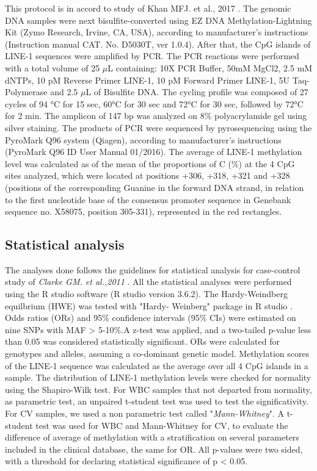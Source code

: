 \documentclass[journal,article,submit,moreauthors,pdftex]{Definitions/mdpi}
\begin{document}
\noindent This protocol is in accord to study of Khan MFJ. et al., 2017 \cite{khan2018evaluating}. The genomic DNA samples were next bisulfite-converted using EZ DNA Methylation-Lightning Kit (Zymo Research, Irvine, CA, USA), according to manufacturer's instructions (Instruction manual CAT. No. D5030T, ver 1.0.4). After that, the CpG islands of LINE-1 sequences were amplified by PCR. The PCR reactions were performed with a total volume of 25 $\mu$L containing: 10X PCR Buffer, 50mM MgCl2, 2.5 mM dNTPs, 10 pM Reverse Primer LINE-1, 10 pM Forward Primer LINE-1, 5U Taq-Polymerase and 2.5 $\mu$L of Bisulfite DNA. The cycling profile was composed of 27 cycles of 94 \si{\celsius} for 15 sec, 60\si{\celsius} for 30 sec and 72\si{\celsius} for 30 sec, followed by 72\si{\celsius} for 2 min. The amplicon of 147 bp was analyzed on 8\% polyacrylamide gel using silver staining. The products of PCR were sequenced by pyrosequencing using the PyroMark Q96 system (Qiagen), according to manufacturer’s instructions (PyroMark Q96 ID User Manual 01/2016). The average of LINE-1 methylation level was calculated as of the mean of the proportions of C (\%) at the 4 CpG sites analyzed, which were located at positions +306, +318, +321 and +328 (positions of the corresponding Guanine in the forward DNA strand, in relation to the first nucleotide base of the consensus promoter sequence in Genebank sequence no. X58075, position 305-331), represented in the red rectangles.

\subsection{Statistical analysis}

\noindent The analyses done follows the guidelines for statistical analysis for case-control study of \textit{Clarke GM. et al.,2011} \cite{clarke2011basic}. All the statistical analyses were performed using the R studio software (R studio version 3.6.2). The Hardy-Weindberg equilbrium (HWE) was tested with "Hardy- Weinberg" package in R studio \cite{graffelman2015exploring}. Odds ratios (ORs) and 95\% confidence intervals (95\% CIs) were estimated on nine SNPs with MAF > 5-10\%.A z-test was applied, and a two-tailed p-value less than 0.05 was considered statistically significant. ORs were calculated for genotypes and alleles, assuming a co-dominant genetic model. Methylation scores of the LINE-1 sequence was calculated as the average over all 4 CpG islands in a sample. The distribution of LINE-1 methylation levels were checked for normality using the Shapiro-Wilk test. For WBC samples that not departed from normality, as parametric test, an unpaired t-student test was used to test the significativity. For CV samples, we used a non parametric test called "\textit{Mann-Whitney}". A t-student test was used for WBC and Mann-Whitney for CV, to evaluate the difference of average of methylation with a stratification on several parameters included in the clinical database, the same for OR. All p-values were two sided, with a threshold for declaring statistical significance of p < 0.05. \\
\end{document}
